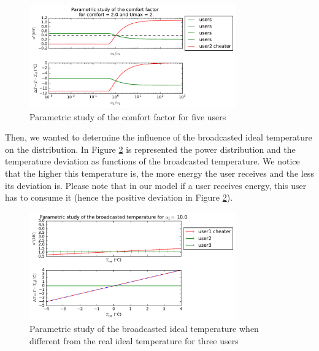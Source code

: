 \documentclass[conference]{IEEEtran}
\begin{document}
\begin{figure}[H]
\centering
\includegraphics[width=3.5in]{statcht5alp.pdf}
\caption{Parametric study of the comfort factor for five users}
\label{SCHT_a5}
\end{figure}

Then, we wanted to determine the influence of the broadcasted ideal temperature on the distribution. In Figure \ref{SCHT_T} is represented the power distribution and the temperature deviation as functions of the broadcasted temperature. We notice that the higher this temperature is, the more energy the user receives and the less its deviation is. Please note that in our model if a user receives energy, this user has to consume it (hence the positive deviation in Figure \ref{SCHT_T}).
\begin{figure}[H]
\centering
\includegraphics[width=3.5in]{statchtbcT.pdf}
\caption{Parametric study of the broadcasted ideal temperature when different from the real ideal temperature for three users}
\label{SCHT_T}
\end{figure}

\end{document}
